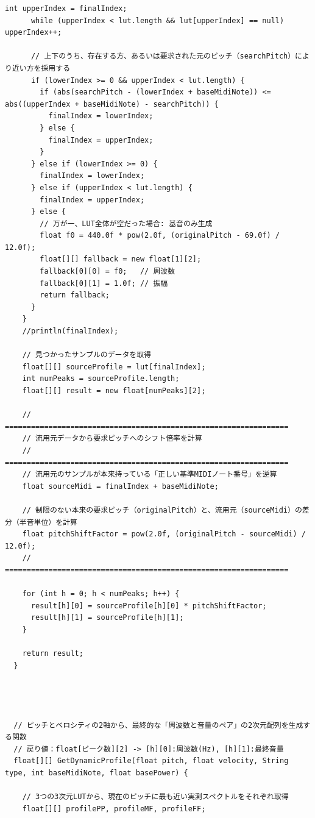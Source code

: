 \begin{lstlisting}[caption={Utils.pde}, label={lst:proc_utils}]
      int upperIndex = finalIndex;
      while (upperIndex < lut.length && lut[upperIndex] == null) upperIndex++;
      
      // 上下のうち、存在する方、あるいは要求された元のピッチ（searchPitch）により近い方を採用する
      if (lowerIndex >= 0 && upperIndex < lut.length) {
        if (abs(searchPitch - (lowerIndex + baseMidiNote)) <= abs((upperIndex + baseMidiNote) - searchPitch)) {
          finalIndex = lowerIndex;
        } else {
          finalIndex = upperIndex;
        }
      } else if (lowerIndex >= 0) {
        finalIndex = lowerIndex;
      } else if (upperIndex < lut.length) {
        finalIndex = upperIndex;
      } else {
        // 万が一、LUT全体が空だった場合: 基音のみ生成
        float f0 = 440.0f * pow(2.0f, (originalPitch - 69.0f) / 12.0f);
        float[][] fallback = new float[1][2];
        fallback[0][0] = f0;   // 周波数
        fallback[0][1] = 1.0f; // 振幅
        return fallback;
      }
    }
    //println(finalIndex);
    
    // 見つかったサンプルのデータを取得
    float[][] sourceProfile = lut[finalIndex];
    int numPeaks = sourceProfile.length;
    float[][] result = new float[numPeaks][2];
    
    // =================================================================
    // 流用元データから要求ピッチへのシフト倍率を計算
    // =================================================================
    // 流用元のサンプルが本来持っている「正しい基準MIDIノート番号」を逆算
    float sourceMidi = finalIndex + baseMidiNote;
    
    // 制限のない本来の要求ピッチ（originalPitch）と、流用元（sourceMidi）の差分（半音単位）を計算
    float pitchShiftFactor = pow(2.0f, (originalPitch - sourceMidi) / 12.0f);
    // =================================================================
    
    for (int h = 0; h < numPeaks; h++) {
      result[h][0] = sourceProfile[h][0] * pitchShiftFactor; 
      result[h][1] = sourceProfile[h][1];
    }
    
    return result;
  }
  
  
  
  
  // ピッチとベロシティの2軸から、最終的な「周波数と音量のペア」の2次元配列を生成する関数
  // 戻り値：float[ピーク数][2] -> [h][0]:周波数(Hz), [h][1]:最終音量
  float[][] GetDynamicProfile(float pitch, float velocity, String type, int baseMidiNote, float basePower) {
    
    // 3つの3次元LUTから、現在のピッチに最も近い実測スペクトルをそれぞれ取得
    float[][] profilePP, profileMF, profileFF;
    

\end{lstlisting}
